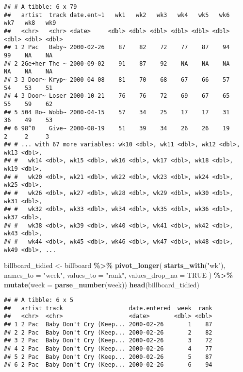 \documentclass[
]{article}
\newenvironment{Shaded}{\begin{snugshade}}{\end{snugshade}}
\newcommand{\AttributeTok}[1]{\textcolor[rgb]{0.13,0.29,0.53}{#1}}
\newcommand{\ConstantTok}[1]{\textcolor[rgb]{0.56,0.35,0.01}{#1}}
\newcommand{\FunctionTok}[1]{\textcolor[rgb]{0.13,0.29,0.53}{\textbf{#1}}}
\newcommand{\NormalTok}[1]{#1}
\newcommand{\OtherTok}[1]{\textcolor[rgb]{0.56,0.35,0.01}{#1}}
\newcommand{\SpecialCharTok}[1]{\textcolor[rgb]{0.81,0.36,0.00}{\textbf{#1}}}
\newcommand{\StringTok}[1]{\textcolor[rgb]{0.31,0.60,0.02}{#1}}
\begin{document}
\begin{verbatim}
## # A tibble: 6 x 79
##   artist  track date.ent~1   wk1   wk2   wk3   wk4   wk5   wk6   wk7   wk8   wk9
##   <chr>   <chr> <date>     <dbl> <dbl> <dbl> <dbl> <dbl> <dbl> <dbl> <dbl> <dbl>
## 1 2 Pac   Baby~ 2000-02-26    87    82    72    77    87    94    99    NA    NA
## 2 2Ge+her The ~ 2000-09-02    91    87    92    NA    NA    NA    NA    NA    NA
## 3 3 Door~ Kryp~ 2000-04-08    81    70    68    67    66    57    54    53    51
## 4 3 Door~ Loser 2000-10-21    76    76    72    69    67    65    55    59    62
## 5 504 Bo~ Wobb~ 2000-04-15    57    34    25    17    17    31    36    49    53
## 6 98^0    Give~ 2000-08-19    51    39    34    26    26    19     2     2     3
## # ... with 67 more variables: wk10 <dbl>, wk11 <dbl>, wk12 <dbl>, wk13 <dbl>,
## #   wk14 <dbl>, wk15 <dbl>, wk16 <dbl>, wk17 <dbl>, wk18 <dbl>, wk19 <dbl>,
## #   wk20 <dbl>, wk21 <dbl>, wk22 <dbl>, wk23 <dbl>, wk24 <dbl>, wk25 <dbl>,
## #   wk26 <dbl>, wk27 <dbl>, wk28 <dbl>, wk29 <dbl>, wk30 <dbl>, wk31 <dbl>,
## #   wk32 <dbl>, wk33 <dbl>, wk34 <dbl>, wk35 <dbl>, wk36 <dbl>, wk37 <dbl>,
## #   wk38 <dbl>, wk39 <dbl>, wk40 <dbl>, wk41 <dbl>, wk42 <dbl>, wk43 <dbl>,
## #   wk44 <dbl>, wk45 <dbl>, wk46 <dbl>, wk47 <dbl>, wk48 <dbl>, wk49 <dbl>, ...
\end{verbatim}

\begin{Shaded}
\begin{Highlighting}[]
\NormalTok{billboard\_tidied }\OtherTok{\textless{}{-}}\NormalTok{ billboard }\SpecialCharTok{\%\textgreater{}\%}
  \FunctionTok{pivot\_longer}\NormalTok{(}
    \FunctionTok{starts\_with}\NormalTok{(}\StringTok{"wk"}\NormalTok{),}
    \AttributeTok{names\_to =} \StringTok{"week"}\NormalTok{,}
    \AttributeTok{values\_to =} \StringTok{"rank"}\NormalTok{,}
    \AttributeTok{values\_drop\_na =} \ConstantTok{TRUE}
\NormalTok{    ) }\SpecialCharTok{\%\textgreater{}\%} 
  \FunctionTok{mutate}\NormalTok{(}\AttributeTok{week =} \FunctionTok{parse\_number}\NormalTok{(week))}
\FunctionTok{head}\NormalTok{(billboard\_tidied)}
\end{Highlighting}
\end{Shaded}

\begin{verbatim}
## # A tibble: 6 x 5
##   artist track                   date.entered  week  rank
##   <chr>  <chr>                   <date>       <dbl> <dbl>
## 1 2 Pac  Baby Don't Cry (Keep... 2000-02-26       1    87
## 2 2 Pac  Baby Don't Cry (Keep... 2000-02-26       2    82
## 3 2 Pac  Baby Don't Cry (Keep... 2000-02-26       3    72
## 4 2 Pac  Baby Don't Cry (Keep... 2000-02-26       4    77
## 5 2 Pac  Baby Don't Cry (Keep... 2000-02-26       5    87
## 6 2 Pac  Baby Don't Cry (Keep... 2000-02-26       6    94
\end{verbatim}
\end{document}
